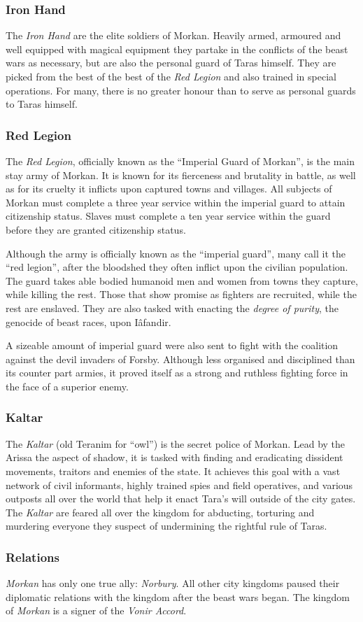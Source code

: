 \subsubsection*{Iron Hand}

The \emph{Iron Hand} are the elite soldiers of Morkan. Heavily armed, armoured
and well equipped with magical equipment they partake in the conflicts of the
beast wars as necessary, but are also the personal guard of Taras himself. They
are picked from the best of the best of the \emph{Red Legion} and also trained
in special operations. For many, there is no greater honour than to serve as
personal guards to Taras himself.

\subsubsection*{Red Legion}

The \emph{Red Legion}, officially known as the ``Imperial Guard of Morkan'',
is the main stay army of Morkan. It is known for its fierceness and brutality
in battle, as well as for its cruelty it inflicts upon captured towns and
villages.  All subjects of Morkan must complete a three year service within
the imperial guard to attain citizenship status. Slaves must complete a ten
year service within the guard before they are granted citizenship status.

Although the army is officially known as the ``imperial guard'', many call it
the ``red legion'', after the bloodshed they often inflict upon the civilian
population. The guard takes able bodied humanoid men and women from towns they
capture, while killing the rest. Those that show promise as fighters are
recruited, while the rest are enslaved. They are also tasked with enacting the
\emph{degree of purity}, the genocide of beast races, upon Iâfandir.

A sizeable amount of imperial guard were also sent to fight with the coalition
against the devil invaders of Forsby. Although less organised and disciplined
than its counter part armies, it proved itself as a strong and ruthless
fighting force in the face of a superior enemy.

\subsubsection*{Kaltar}

The \emph{Kaltar} (old Teranim for ``owl'') is the secret police of
Morkan. Lead by the Arissa the aspect of shadow, it is tasked with finding and
eradicating dissident movements, traitors and enemies of the state.  It
achieves this goal with a vast network of civil informants, highly trained
spies and field operatives, and various outposts all over the world that help
it enact Tara's will outside of the city gates. The \emph{Kaltar} are feared
all over the kingdom for abducting, torturing and murdering everyone they
suspect of undermining the rightful rule of Taras.

\subsubsection*{Relations}

\emph{Morkan} has only one true ally: \emph{Norbury}. All other city kingdoms
paused their diplomatic relations with the kingdom after the beast wars began.
The kingdom of \emph{Morkan} is a signer of the \emph{Vonir Accord}.
